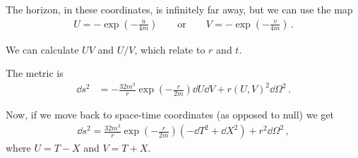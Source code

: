 \documentclass[main.tex]{subfiles}
\begin{document}
The horizon, in these coordinates, is infinitely far away, but we can use the map 
%
\begin{align}
U = - \exp( - \frac{u}{4m}) 
\qquad \text{or} \qquad
V = - \exp( - \frac{v}{4m}) 
\,.
\end{align}

We can calculate \(UV\) and \(U/V\), which relate to \(r\) and \(t\).

The metric is 
%
\begin{align}
\dd{s^2} &= - \frac{32m^3}{r} \exp(- \frac{r}{2m}) \dd{U} \dd{V} 
+ r(U, V)^2 \dd{\Omega^2}
\,.
\end{align}

Now, if we move back to space-time coordinates (as opposed to null) we get 
%
\begin{align}
\dd{s^2} = \frac{32m^3}{r}  \exp(- \frac{r}{2m}) (- \dd{T^2} + \dd{X^2}) + r^2 \dd{\Omega^2}
\,,
\end{align}
%
where \(U = T-X\) and \(V = T+X\). 
\end{document}
